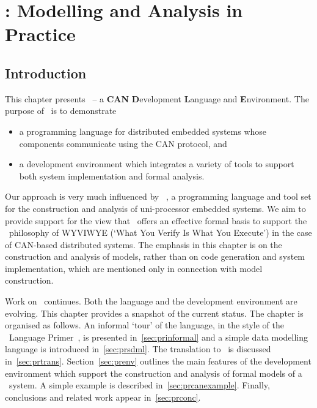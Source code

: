 \chapter{\candle: Modelling and Analysis in Practice}\label{chap:practice}
\section{Introduction}
This chapter presents \candle\ -- a {\bf CAN} {\bf D}evelopment 
{\bf L}anguage and {\bf E}nviron\-ment.
The purpose of \candle\ is to demonstrate
\begin{itemize}
\item a programming language for
distributed embedded systems whose components communicate using the 
CAN protocol, and
\item a development environment which integrates a variety of tools
  to support both system implementation and formal analysis.
\end{itemize} 

Our approach is very much influenced by \esterel~\cite{bg:92}, a
programming language and tool set for the construction and analysis of
uni-processor embedded systems. We aim to provide support for the view
that \bcandle\ offers an effective formal basis to support the \esterel\
philosophy of WYVIWYE (`What You Verify Is What You Execute') in the
case of CAN-based distributed systems. The emphasis in this chapter is
on the construction and analysis of models, rather than on code generation
and system implementation, which are mentioned only in connection with
model construction.
  
Work on \candle\ continues. Both the language and the development
environment are evolving. This chapter provides a snapshot of the
current status. The chapter is organised as follows. An informal
`tour' of the language, in the style of the \esterel\ Language
Primer~\cite{ber:98a}, is presented in~\Sec\ref{sec:prinformal} and a
simple data modelling language is introduced in~\Sec\ref{sec:prsdml}.
The translation to \bcandle\ is discussed in~\Sec\ref{sec:prtrans}.
Section~\ref{sec:prenv} outlines the main features of the development
environment which support the construction and analysis of formal
models of a \candle\ system.  A simple example is described
in~\Sec\ref{sec:prcanexample}.  Finally, conclusions and related work
appear in~\Sec\ref{sec:prconc}.

